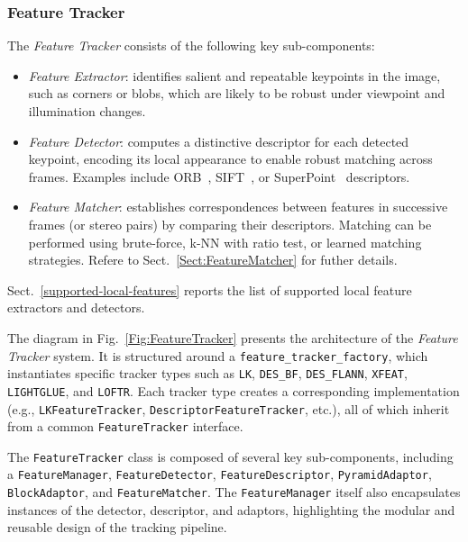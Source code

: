 \documentclass{article}
\begin{document}
\subsubsection{Feature Tracker}

The \textit{Feature Tracker} consists of the following key sub-components:

\begin{itemize}
\item \textit{Feature Extractor}: identifies salient and repeatable keypoints in the image, such as corners or blobs, which are likely to be robust under viewpoint and illumination changes. 

\item \textit{Feature Detector}: computes a distinctive descriptor for each detected keypoint, encoding its local appearance to enable robust matching across frames. Examples include ORB~\cite{rublee2011orb}, SIFT~\cite{lowe1999object}, or SuperPoint~\cite{detone18superpoint} descriptors.

\item \textit{Feature Matcher}: establishes correspondences between features in successive frames (or stereo pairs) by comparing their descriptors. Matching can be performed using brute-force, k-NN with ratio test, or learned matching strategies. Refere to Sect.~\ref{Sect:FeatureMatcher} for futher details.
\end{itemize}

Sect.~\ref{supported-local-features} reports the list of supported local feature extractors and detectors.

The diagram in Fig.~\ref{Fig:FeatureTracker} presents the architecture of the \textit{Feature Tracker} system. It is structured around a \texttt{feature\_tracker\_factory}, which instantiates specific tracker types such as \texttt{LK}, \texttt{DES\_BF}, \texttt{DES\_FLANN}, \texttt{XFEAT}, \texttt{LIGHTGLUE}, and \texttt{LOFTR}. Each tracker type creates a corresponding implementation (e.g., \texttt{LKFeatureTracker}, \texttt{DescriptorFeatureTracker}, etc.), all of which inherit from a common \texttt{FeatureTracker} interface.

The \texttt{FeatureTracker} class is composed of several key sub-components, including a \texttt{FeatureManager}, \texttt{FeatureDetector}, \texttt{FeatureDescriptor}, \texttt{PyramidAdaptor}, \texttt{BlockAdaptor}, and \texttt{FeatureMatcher}. The \texttt{FeatureManager} itself also encapsulates instances of the detector, descriptor, and adaptors, highlighting the modular and reusable design of the tracking pipeline.
\end{document}
